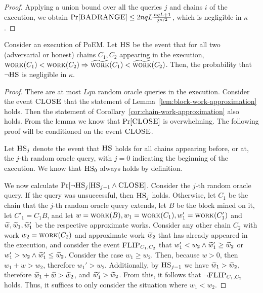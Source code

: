 \begin{proof}
  Applying a union bound over all the queries $j$ and chains $i$ of the execution, we obtain
  $\Pr[\textsc{BADRANGE}] \leq 2 nqL \frac{nqL + 1}{2^{\kappa/2}}$, which is negligible in $\kappa$.
  \Qed
\end{proof}

\begin{lemma}
  Consider an execution of PoEM. Let $\textsc{HS}$ be the event that for all two (adversarial or honest) chains
  $C_1, C_2$ appearing in the execution,
  $\textsc{work}(C_1) < \textsc{work}(C_2) \Rightarrow \widetilde{\textsc{work}}(C_1) < \widetilde{\textsc{work}}(C_2)$.
  Then, the probability that $\lnot \textsc{HS}$ is negligible in $\kappa$.
\end{lemma}
\begin{proof}
  There are at most $Lqn$ random oracle queries in the execution.
  Consider the event $\textsc{CLOSE}$ that the statement of Lemma~\ref{lem:block-work-approximation}
  holds.
  Then the statement of Corollary~\ref{cor:chain-work-approximation} also holds.
  From the lemma we know that $\Pr[\textsc{CLOSE}]$ is overwhelming.
  The following proof will be conditioned on the event $\textsc{CLOSE}$.

  Let $\textsc{HS}_j$ denote the event that $\textsc{HS}$ holds for all chains appearing
  before, or at, the $j$-th random oracle query, with $j = 0$ indicating
  the beginning of the execution. We know that $\textsc{HS}_0$ always holds by definition.

  We now calculate $\Pr[\lnot \textsc{HS}_j | \textsc{HS}_{j - 1} \land \textsc{CLOSE}]$.
  Consider the $j$-th random oracle query.
  If the query was unsuccessful, then $\textsc{HS}_j$ holds. Otherwise, let $C_1$ be the chain
  that the $j$-th random oracle query extends, let $B$ be the block mined on it,
  let $C'_1 = C_1 B$, and let $w = \textsc{work}(B), w_1 = \textsc{work}(C_1), w'_1 = \textsc{work}(C'_1)$
  and $\widetilde{w}, \widetilde{w}_1, \widetilde{w}'_1$ be the respective approximate works.
  Consider any other chain $C_2$ with work $w_2 = \textsc{work}(C_2)$
  and approximate work $\widetilde{w}_2$
  that has already appeared in the execution,
  and consider the event $\textsc{FLIP}_{C_1,C_2}$ that
  $w'_1 < w_2 \land \widetilde{w}'_1 \geq \widetilde{w}_2$ or $w'_1 > w_2 \land \widetilde{w}'_1 \leq \widetilde{w}_2$.
  Consider the case $w_1 \geq w_2$. Then, because $w > 0$, then $w_1 + w > w_2$, therefore $w_1' > w_2$.
  Additionally, by $\textsc{HS}_{j - 1}$ we have $\widetilde{w}_1 > \widetilde{w}_2$, therefore $\widetilde{w}_1 + \widetilde{w} > \widetilde{w}_2$, and
  $\widetilde{w}_1' > \widetilde{w}_2$. From this, it follows that $\lnot \textsc{FLIP}_{C_1,C_2}$ holds.
  Thus, it suffices to only consider the situation where $w_1 < w_2$.


\end{proof}
